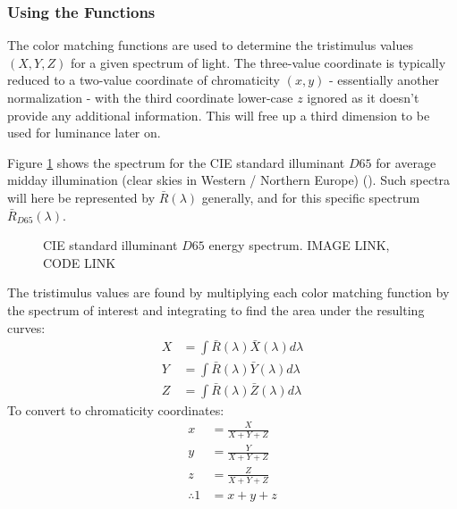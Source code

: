 \documentclass[twocolumn]{article}
\newif\ifinvert
\begin{document}
\subsubsection{Using the Functions}
The color matching functions are used to determine the tristimulus values $(X,Y,Z)$ for a given spectrum of light.  The three-value coordinate is typically reduced to a two-value coordinate of chromaticity $(x,y)$ - essentially another normalization - with the third coordinate lower-case $z$ ignored as it doesn't provide any additional information.  This will free up a third dimension to be used for luminance later on.

Figure \ref{fig:d65_spectrum} shows the spectrum for the CIE standard illuminant $D65$ for average midday illumination (clear skies in Western / Northern Europe) (\cite{judd1964spectral}).  Such spectra will here be represented by $\bar{R}(\lambda)$ generally, and for this specific spectrum $\bar{R}_{D65}(\lambda)$.
\begin{figure}[h]
    \ifinvert
        
    \else
        
    \fi
    \caption{CIE standard illuminant $D65$ energy spectrum.  IMAGE LINK, CODE LINK}\label{fig:d65_spectrum}
\end{figure}
The tristimulus values are found by multiplying each color matching function by the spectrum of interest and integrating to find the area under the resulting curves:
\begin{equation}\label{eq:tristimulus_from_spectrum}
    \begin{aligned}
        X&=\int\bar{R}(\lambda)\bar{X}(\lambda)d\lambda\\
        Y&=\int\bar{R}(\lambda)\bar{Y}(\lambda)d\lambda\\
        Z&=\int\bar{R}(\lambda)\bar{Z}(\lambda)d\lambda
    \end{aligned}
\end{equation}
To convert to chromaticity coordinates:
\begin{equation}\label{eq:chromaticity_from_tristimulus}
    \begin{aligned}
        x&=\frac{X}{X+Y+Z}\\
        y&=\frac{Y}{X+Y+Z}\\
        z&=\frac{Z}{X+Y+Z}\\
        \therefore 1&=x+y+z
    \end{aligned}
\end{equation}
\end{document}

